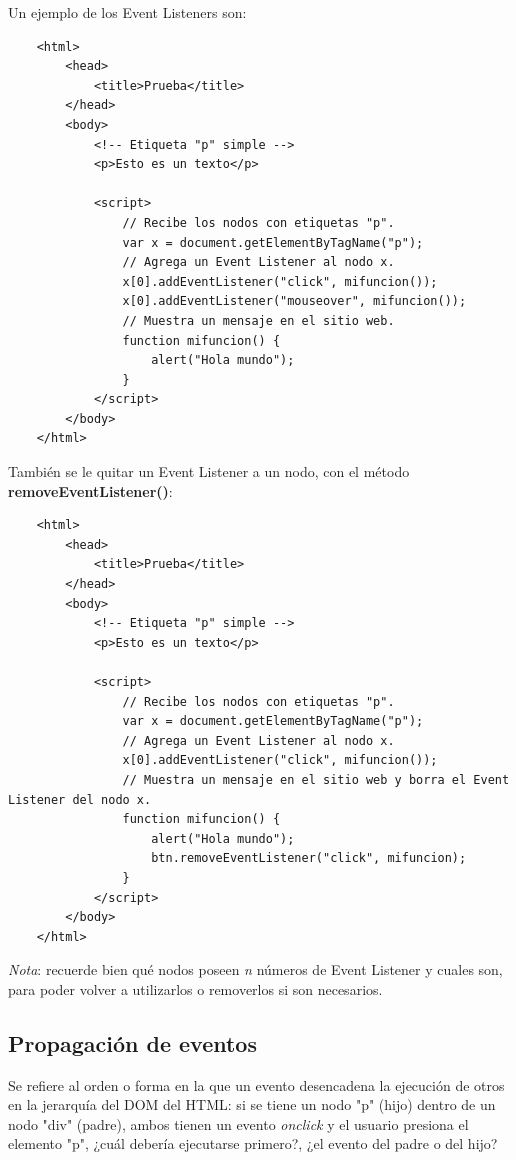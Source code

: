 Un ejemplo de los Event Listeners son:

\begin{lstlisting}
    <html>
        <head>
            <title>Prueba</title>
        </head>
        <body>
            <!-- Etiqueta "p" simple -->
            <p>Esto es un texto</p>
            
            <script>
                // Recibe los nodos con etiquetas "p".
                var x = document.getElementByTagName("p");
                // Agrega un Event Listener al nodo x.
                x[0].addEventListener("click", mifuncion());
                x[0].addEventListener("mouseover", mifuncion());
                // Muestra un mensaje en el sitio web.
                function mifuncion() {
                    alert("Hola mundo");
                }
            </script>
        </body>
    </html>
\end{lstlisting}

También se le quitar un Event Listener a un nodo, con el método \textbf{removeEventListener()}:
\begin{lstlisting}
    <html>
        <head>
            <title>Prueba</title>
        </head>
        <body>
            <!-- Etiqueta "p" simple -->
            <p>Esto es un texto</p>
            
            <script>
                // Recibe los nodos con etiquetas "p".
                var x = document.getElementByTagName("p");
                // Agrega un Event Listener al nodo x.
                x[0].addEventListener("click", mifuncion());
                // Muestra un mensaje en el sitio web y borra el Event Listener del nodo x.
                function mifuncion() {
                    alert("Hola mundo");
                    btn.removeEventListener("click", mifuncion);
                }
            </script>
        </body>
    </html>
\end{lstlisting}

\textit{Nota}: recuerde bien qué nodos poseen \textit{n} números de Event Listener y cuales son, para poder volver a utilizarlos o removerlos si son necesarios.


\subsection{Propagación de eventos}

Se refiere al orden o forma en la que un evento desencadena la ejecución de otros en la jerarquía del DOM del HTML: si se tiene un nodo "p" (hijo) dentro de un nodo "div" (padre), ambos tienen un evento \textit{onclick} y el usuario presiona el elemento "p", ¿cuál debería ejecutarse primero?, ¿el evento del padre o del hijo?

